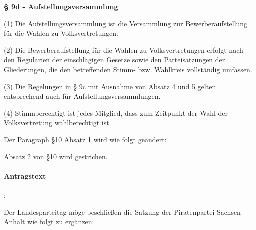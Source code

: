 {\textbf{§ 9d - Aufstellungsversammlung}

(1) Die Aufstellungsversammlung ist die Versammlung zur Bewerberaufstellung für die Wahlen zu Volksvertretungen.

(2) Die Bewerberaufstellung für die Wahlen zu Volksvertretungen erfolgt nach den Regularien der einschlägigen Gesetze sowie den Parteisatzungen der Gliederungen, die den betreffenden Stimm- bzw. Wahlkreis vollständig umfassen.

(3) Die Regelungen in § 9c mit Ausnahme von Absatz 4 und 5 gelten entsprechend auch für Aufstellungsversammlungen.

(4) Stimmberechtigt ist jedes Mitglied, dass zum Zeitpunkt der Wahl der Volksvertretung wahlberechtigt ist.}

Der Paragraph §10 Absatz 1 wird wie folgt geändert:


Absatz 2 von §10 wird gestrichen. 




\paragraph{Antragstext}:

Der Landesparteitag möge beschließen die Satzung der Piratenpartei Sachsen-Anhalt wie folgt zu ergänzen:

